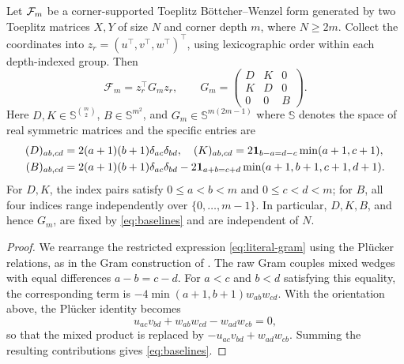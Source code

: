 \begin{lemma}\label{lem:corner-gram}
Let $\mathcal{F}_m$ be a corner-supported Toeplitz B\"ottcher--Wenzel form
generated by two Toeplitz matrices $X,Y$ of size $N$ and corner depth
$m$, where $N\ge2m$.  
Collect the coordinates into
$z_r=(u^\top,v^\top,w^\top)^\top$, using lexicographic
order within each depth-indexed group.
Then
\begin{equation}\label{eq:baseline-gram}
 \mathcal F_m=z_r^\top G_mz_r,\qquad
 G_m=
 \begin{pmatrix}
 D&K&0\\
 K&D&0\\
 0&0&B
 \end{pmatrix}.
\end{equation}
Here $D,K\in\mathbb S^{\binom m2}$,
$B\in\mathbb S^{m^2}$, and
$G_m\in\mathbb S^{m(2m-1)}$ where $
\mathbb S 
$
denotes the space of real symmetric matrices and the specific entries are
\begin{equation}\label{eq:baselines}
\begin{aligned}
 (D)_{ab,cd}
 &=2(a+1)(b+1)\delta_{ac}\delta_{bd}, \quad
 (K)_{ab,cd}
  =2\mathbf{1}_{b-a=d-c}\min(a+1,c+1),\\
 (B)_{ab,cd}
 &=2(a+1)(b+1)\delta_{ac}\delta_{bd}
 -2\mathbf{1}_{a+b=c+d}\min(a+1,b+1,c+1,d+1).
\end{aligned}
\end{equation}
For $D,K$, the index pairs satisfy $0\le a<b<m$ and
$0\le c<d<m$; for $B$, all four indices range independently over
$\{0,\ldots,m-1\}$.  In particular, $D,K,B$, and hence $G_m$, are fixed by \eqref{eq:baselines} and are independent of $N$.
\end{lemma}

\begin{proof}
We rearrange the restricted expression \eqref{eq:literal-gram} using
the Pl\"ucker relations, as in the Gram construction of
\cite[Sections~2 and~5]{laszlo2012}.  The raw Gram couples mixed wedges
with equal differences $a-b=c-d$.  For $a<c$ and $b<d$ satisfying this
equality, the corresponding term is
$-4\min(a+1,b+1)w_{ab}w_{cd}$.  With the orientation above, the Pl\"ucker
identity becomes
\begin{equation}\label{eq:exchange}
 u_{ac}v_{bd}+w_{ab}w_{cd}-w_{ad}w_{cb}=0,
\end{equation}
so that the mixed product is replaced by
$-u_{ac}v_{bd}+w_{ad}w_{cb}$.  Summing the resulting contributions gives
\eqref{eq:baselines}.
\end{proof}


